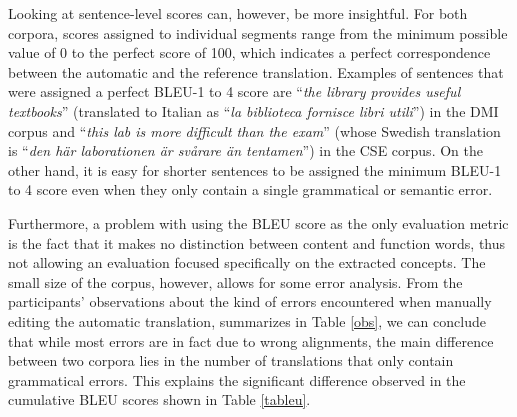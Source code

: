 \documentclass[11pt]{article}
\begin{document}
Looking at sentence-level scores can, however, be more insightful. 
For both corpora, scores assigned to individual segments range from the minimum possible value of 0 to the perfect score of 100, which indicates a perfect correspondence between the automatic and the reference translation.
Examples of sentences that were assigned a perfect BLEU-1 to 4 score are ``\textit{the library provides useful textbooks}'' (translated to Italian as ``\textit{la biblioteca fornisce libri utili}'') in the DMI corpus and ``\textit{this lab is more difficult than the exam}'' (whose Swedish translation is ``\textit{den här laborationen är svårare än tentamen}'') in the CSE corpus.
On the other hand, it is easy for shorter sentences to be assigned the minimum BLEU-1 to 4 score even when they only contain a single grammatical or semantic error. 

Furthermore, a problem with using the BLEU score as the only evaluation metric is the fact that it makes no distinction between content and function words, thus not allowing an evaluation focused specifically on the extracted concepts. 
The small size of the corpus, however, allows for some error analysis. 
From the participants' observations about the kind of errors encountered when manually editing the automatic translation, summarizes in Table \ref{obs}, we can conclude that while most errors are in fact due to wrong alignments, the main difference between two corpora lies in the number of translations that only contain grammatical errors.
This explains the significant difference observed in the cumulative BLEU scores shown in Table \ref{tableu}.
\end{document}

